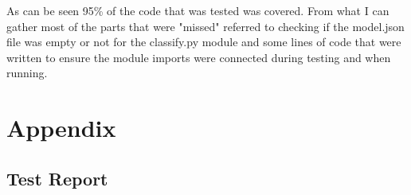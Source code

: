 \documentclass[12pt, titlepage]{article}
\begin{document}
As can be seen 95\% of the code that was tested was covered. From what I can gather most of the parts that were
"missed" referred to checking if the model.json file was empty or not for the classify.py module and some lines of code
that were written to ensure the module imports were connected during testing and when running.

\newpage{}




\newpage{}

\section{Appendix}
\subsection{Test Report} \label{test_report}
\end{document}
